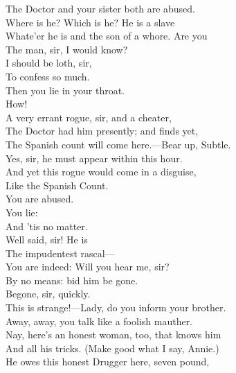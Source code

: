 \documentclass[a4paper,oneside,12pt]{memoir}
\begin{document}
\begin{drama*}
The Doctor and your sister both are abused.\\
\kastrilspeaks Where is he? Which is he? He is a slave\\
Whate'er he is and the son of a whore. Are you\\
The man, sir, I would know?\\
\surlyspeaks {} I should be loth, sir,\\
To confess so much.\\
\kastrilspeaks {} Then you lie in your throat.\\
\surlyspeaks {} How!\\
\facespeaks A very errant rogue, sir, and a cheater,\\
The Doctor had him presently; and finds yet,\\
The Spanish count will come here.---Bear up, Subtle.\\
\subtlespeaks Yes, sir, he must appear within this hour.\\
\facespeaks And yet this rogue would come in a disguise,\\
Like the Spanish Count.\\
\surlyspeaks {} You are abused.\\
\kastrilspeaks {} You lie:\\
And 'tis no matter.\\
\facespeaks {} Well said, sir! He is\\
The impudentest rascal---\\
\surlyspeaks {} You are indeed: Will you hear me, sir?\\
\facespeaks By no means: bid him be gone.\\
\kastrilspeaks {} Begone, sir, quickly.\\
\surlyspeaks This is strange!---Lady, do you inform your brother.\\
\kastrilspeaks Away, away, you talk like a foolish mauther.\\
\facespeaks Nay, here's an honest woman, too, that knows him\\
And all his tricks. (Make good what I say, Annie.)\\
He owes this honest Drugger here, seven pound,\\

\end{drama*}
\end{document}
